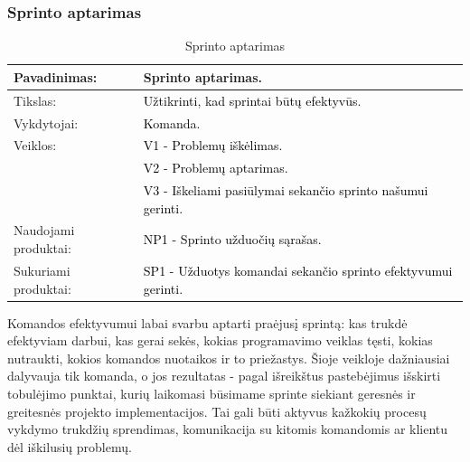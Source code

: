 \documentclass{VUMIFPSkursinis}
\begin{document}
	\subsubsection{Sprinto aptarimas}
	\begin{center}
		\begin{table}[ht]
			\caption{Sprinto aptarimas}
			\begin{tabular}{ | l | l | }
				\hline
				Pavadinimas:         & Sprinto aptarimas.							\\ \hline
				Tikslas:             & \textcolor{black}{Užtikrinti, kad sprintai būtų efektyvūs.}				\\ \hline
				Vykdytojai:          & \textcolor{black}{ Komanda.}								\\ \hline
				Veiklos:             & \textcolor{black}{ V1 - Problemų iškėlimas.}						\\
				                     & \textcolor{black}{V2 - Problemų aptarimas.}						\\
				                     & \textcolor{black}{V3 - Iškeliami pasiūlymai sekančio sprinto našumui gerinti.}		\\ \hline
				Naudojami produktai: & \textcolor{black}{NP1 - Sprinto užduočių sąrašas. 	}				\\ \hline
				Sukuriami produktai: & \textcolor{black}{SP1 - Užduotys komandai sekančio sprinto efektyvumui gerinti.}	\\ \hline
			\end{tabular}
		\end{table}
	\end{center}
	Komandos efektyvumui labai svarbu aptarti praėjusį sprintą: kas trukdė efektyviam darbui, kas gerai sekės, kokias programavimo veiklas tęsti, kokias nutraukti, kokios komandos nuotaikos ir to priežastys.
	Šioje veikloje dažniausiai dalyvauja tik komanda, o jos rezultatas - pagal išreikštus pastebėjimus išskirti tobulėjimo punktai, kurių laikomasi būsimame sprinte siekiant geresnės ir greitesnės projekto implementacijos.
	Tai gali būti aktyvus kažkokių procesų vykdymo trukdžių sprendimas, komunikacija su kitomis komandomis ar klientu dėl iškilusių problemų.

	\newpage
\end{document}
